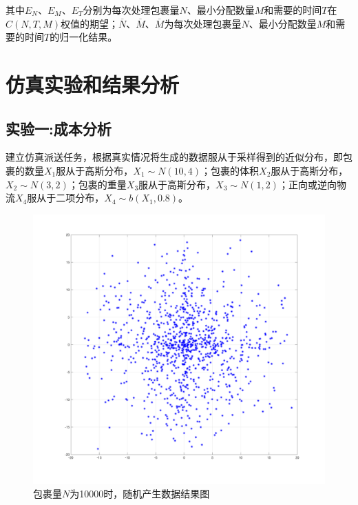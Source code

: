 \documentclass[twocolumn]{jbuaa}
\begin{document}
	其中$E_{N}$、$E_{M}$、$E_{T}$分别为每次处理包裹量$N$、最小分配数量$M$和需要的时间$T$在$C(N,T,M)$权值的期望；$\overline N$、$\overline M$、$\overline M$为每次处理包裹量$N$、最小分配数量$M$和需要的时间$T$的归一化结果。
















	\section{仿真实验和结果分析}

	\subsection{实验一:成本分析}
	建立仿真派送任务，根据真实情况将生成的数据服从于采样得到的近似分布，即包裹的数量$X_{1}$服从于高斯分布，$X_{1} \sim N(10,4)$；包裹的体积$X_{2}$服从于高斯分布，$X_{2} \sim N(3,2) $；包裹的重量$X_{3}$服从于高斯分布，$X_{3} \sim N(1,2)$；正向或逆向物流$X_{4}$服从于二项分布，$X_{4} \sim b(X_{1},0.8)$。

	\begin{figure}
		\centering
		\includegraphics[scale=0.11]{Figs/uavbefore.png}
		\caption{包裹量$N$为10000时，随机产生数据结果图}
		\label{fig:01}
	\end{figure}
\end{document}
